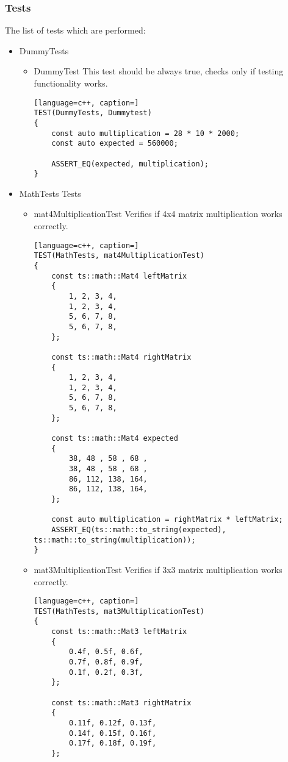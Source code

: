 \subsubsection{Tests}
The list of tests which are performed:
\begin{itemize}
    \item DummyTests
        \begin{itemize}
            \item DummyTest This test should be always true, checks only if testing functionality works.
            \begin{lstlisting}[language=c++, caption=]
TEST(DummyTests, Dummytest)
{
    const auto multiplication = 28 * 10 * 2000;
    const auto expected = 560000;

    ASSERT_EQ(expected, multiplication);
}
            \end{lstlisting}
        \end{itemize}
    \item MathTests Tests \hyperref[]{}
        \begin{itemize}
            \item mat4MultiplicationTest Verifies if 4x4 matrix multiplication works correctly.
            \begin{lstlisting}[language=c++, caption=]
TEST(MathTests, mat4MultiplicationTest)
{
    const ts::math::Mat4 leftMatrix
    {
        1, 2, 3, 4,
        1, 2, 3, 4,
        5, 6, 7, 8,
        5, 6, 7, 8,
    };

    const ts::math::Mat4 rightMatrix
    {
        1, 2, 3, 4,
        1, 2, 3, 4,
        5, 6, 7, 8,
        5, 6, 7, 8,
    };

    const ts::math::Mat4 expected
    {
        38, 48 , 58 , 68 ,
        38, 48 , 58 , 68 ,
        86, 112, 138, 164,
        86, 112, 138, 164,
    };

    const auto multiplication = rightMatrix * leftMatrix;
    ASSERT_EQ(ts::math::to_string(expected), ts::math::to_string(multiplication));
}
            \end{lstlisting}
            \item mat3MultiplicationTest Verifies if 3x3 matrix multiplication works correctly.
            \begin{lstlisting}[language=c++, caption=]
TEST(MathTests, mat3MultiplicationTest)
{
    const ts::math::Mat3 leftMatrix
    {
        0.4f, 0.5f, 0.6f,
        0.7f, 0.8f, 0.9f,
        0.1f, 0.2f, 0.3f,
    };

    const ts::math::Mat3 rightMatrix
    {
        0.11f, 0.12f, 0.13f,
        0.14f, 0.15f, 0.16f,
        0.17f, 0.18f, 0.19f,
    };


\end{lstlisting}
\end{itemize}
\end{itemize}
